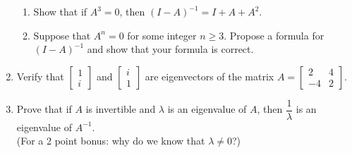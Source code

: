 \documentclass[12pt]{article}
\newcommand{\points}[1]{\marginpar{\hspace{24pt}[#1]}}
\newcommand{\bbm}{\begin{bmatrix}}
\newcommand{\ebm}{\end{bmatrix}}
\begin{document}
\begin{enumerate}
\begin{enumerate}
 \item Show that if $A^3=0$, then $(I-A)^{-1} = I+A+A^2$. \points{2}

\vspace{2.25in}

 \item Suppose that $A^n=0$ for some integer $n\geq 3$. Propose a formula for $(I-A)^{-1}$ and show that your formula is correct. \points{3}



\end{enumerate}


\newpage

 \item Verify that $\bbm 1\\i\ebm$ and $\bbm i\\1\ebm$ are eigenvectors of the matrix $A = \bbm 2&4\\-4&2\ebm$. \points{3}

\vspace{4in}

 \item Prove that if $A$ is invertible and $\lambda$ is an eigenvalue of $A$, then $\dfrac{1}{\lambda}$ is an eigenvalue of $A^{-1}$. \points{4}\\
(For a 2 point bonus: why do we know that $\lambda\neq 0$?)






\end{enumerate}
\end{document}
